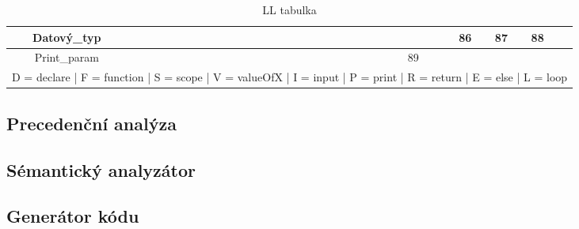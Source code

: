 \documentclass[11pt, a4paper]{article}
\begin{document}
\begin{table}[H]
{{\begin{tabular}{|c|c|c|c|c|c|c|c|c|c|c|c|c|c|c|c|c|c|c|c|c|c|c|}
				Datový\_typ         &         &          &       &    &    &    &     &    &    &       &       &        &     &      &      &    &     &         & 86      & 87     & 88     &    \\ \hline
				Print\_param        &         &          &       &    &    &    &     &    &    &       &       &        &     &      &      &    & 89  &         &         &        &        &    \\ \hline
				\multicolumn{23}{c}{D = declare | F = function | S = scope | V = valueOfX | I = input | P = print | R = return | E = else | L = loop }
			\end{tabular}
			}}
			\caption{LL tabulka}
			\label{gramatika}
		\end{table}

		
		
	\subsection{Precedenční analýza}
	\subsection{Sémantický analyzátor}
	\subsection{Generátor kódu}
\end{document}

